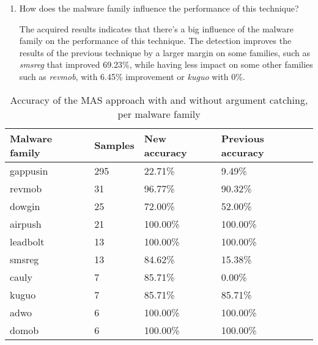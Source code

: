 \begin{enumerate}
    \item How does the malware family influence the performance of this technique?

    The acquired results indicates that there's a big influence of the malware family on the performance of this technique. The detection improves the results of the previous technique by a larger margin on some families, such as \textit{smsreg} that improved 69.23\%, while having less impact on some other families such as \textit{revmob}, with 6.45\% improvement or \textit{kuguo} with 0\%.
\end{enumerate}


\begin{table}[]
\fontsize{12pt}{12pt}\selectfont
\centering
\caption{Accuracy of the MAS approach with and without argument catching, per malware family}
\label{tab:per-family-results}
\begin{tabular}{|l|l|l|l|}
\hline
\textbf{Malware family} & \textbf{Samples} & \textbf{New accuracy} & \textbf{Previous accuracy} \\ \hline
gappusin                & 295              & 22.71\%               & 9.49\%                     \\ \hline
revmob                  & 31               & 96.77\%               & 90.32\%                    \\ \hline
dowgin                  & 25               & 72.00\%               & 52.00\%                    \\ \hline
airpush                 & 21               & 100.00\%              & 100.00\%                   \\ \hline
leadbolt                & 13               & 100.00\%              & 100.00\%                   \\ \hline
smsreg                  & 13               & 84.62\%               & 15.38\%                    \\ \hline
cauly                   & 7                & 85.71\%               & 0.00\%                     \\ \hline
kuguo                   & 7                & 85.71\%               & 85.71\%                    \\ \hline
adwo                    & 6                & 100.00\%              & 100.00\%                   \\ \hline
domob                   & 6                & 100.00\%              & 100.00\%                   \\ \hline

\end{tabular}
\end{table}
